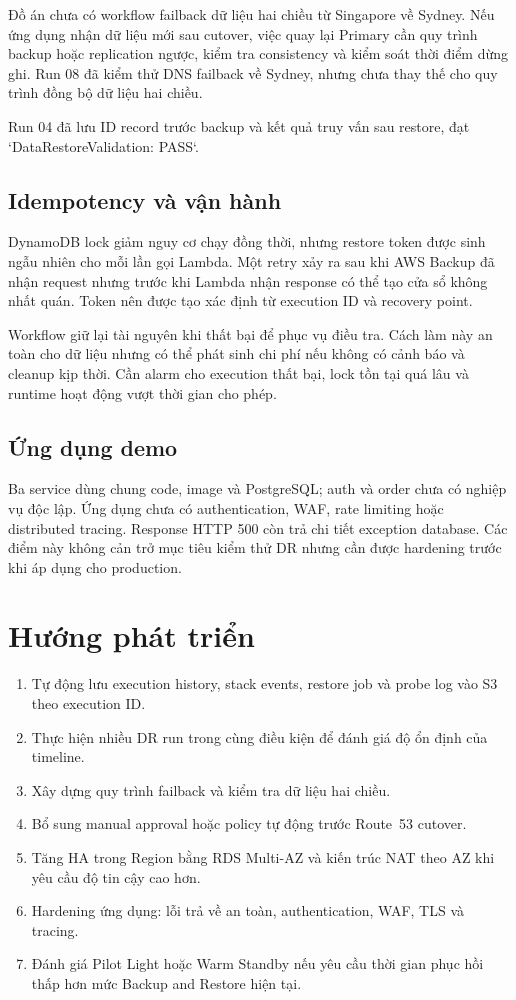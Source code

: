 Đồ án chưa có workflow failback dữ liệu hai chiều từ Singapore về Sydney. Nếu ứng dụng nhận dữ liệu mới sau cutover, việc quay lại Primary cần quy trình backup hoặc replication ngược, kiểm tra consistency và kiểm soát thời điểm dừng ghi. Run 08 đã kiểm thử DNS failback về Sydney, nhưng chưa thay thế cho quy trình đồng bộ dữ liệu hai chiều.

Run 04 đã lưu ID record trước backup và kết quả truy vấn sau restore, đạt `DataRestoreValidation: PASS`.

\subsection{Idempotency và vận hành}

DynamoDB lock giảm nguy cơ chạy đồng thời, nhưng restore token được sinh ngẫu nhiên cho mỗi lần gọi Lambda. Một retry xảy ra sau khi AWS Backup đã nhận request nhưng trước khi Lambda nhận response có thể tạo cửa sổ không nhất quán. Token nên được tạo xác định từ execution ID và recovery point.

Workflow giữ lại tài nguyên khi thất bại để phục vụ điều tra. Cách làm này an toàn cho dữ liệu nhưng có thể phát sinh chi phí nếu không có cảnh báo và cleanup kịp thời. Cần alarm cho execution thất bại, lock tồn tại quá lâu và runtime hoạt động vượt thời gian cho phép.

\subsection{Ứng dụng demo}

Ba service dùng chung code, image và PostgreSQL; auth và order chưa có nghiệp vụ độc lập. Ứng dụng chưa có authentication, WAF, rate limiting hoặc distributed tracing. Response HTTP 500 còn trả chi tiết exception database. Các điểm này không cản trở mục tiêu kiểm thử DR nhưng cần được hardening trước khi áp dụng cho production.

\section{Hướng phát triển}

\begin{enumerate}
  \item Tự động lưu execution history, stack events, restore job và probe log vào S3 theo execution ID.
  \item Thực hiện nhiều DR run trong cùng điều kiện để đánh giá độ ổn định của timeline.
  \item Xây dựng quy trình failback và kiểm tra dữ liệu hai chiều.
  \item Bổ sung manual approval hoặc policy tự động trước Route~53 cutover.
  \item Tăng HA trong Region bằng RDS Multi-AZ và kiến trúc NAT theo AZ khi yêu cầu độ tin cậy cao hơn.
  \item Hardening ứng dụng: lỗi trả về an toàn, authentication, WAF, TLS và tracing.
  \item Đánh giá Pilot Light hoặc Warm Standby nếu yêu cầu thời gian phục hồi thấp hơn mức Backup and Restore hiện tại.
\end{enumerate}

